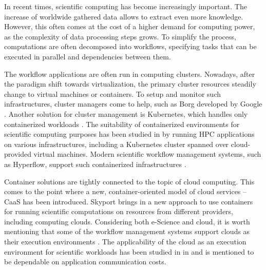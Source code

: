 

In recent times, scientific computing has become increasingly important.
The increase of worldwide gathered data allows to extract even more knowledge.
However, this often comes at the cost of a higher demand for computing power,
as the complexity of data processing steps grows.
To simplify the process, computations are often decomposed into workflows, specifying tasks that can be executed in parallel and dependencies between them.




The workflow applications are often run in computing clusters.
Nowadays, after the paradigm shift towards virtualization, the primary cluster resources steadily change to virtual machines or containers.
To setup and monitor such infrastructures, cluster managers come to help, such as Borg developed by Google \cite{b:Borg}.
Another solution for cluster management is Kubernetes, which handles only containerized workloads \cite{b:Kubernetes-what-is}.
The suitability of containerized environments for scientific computing purposes has been studied in \cite{b:Enable-HPC-Cloud-K8s} by running HPC applications on various infrastructures, including a Kubernetes cluster spanned over cloud-provided virtual machines.
Modern scientific workflow management systems, such as Hyperflow, support such containerized infrastructures \cite{b:Hyperflow-K8s}.


Container solutions are tightly connected to the topic of cloud computing.
This comes to the point where a new, container-oriented model of cloud services -- CaaS \cite{b:IBM-CaaS} has been introduced.
Skyport \cite{b:Skyport} brings in a new approach to use containers for running scientific computations on resources from different providers, including computing clouds.
Considering both e-Science and cloud, it is worth mentioning that some of the workflow management systems support clouds as their execution environments
\cite{b:Pegasus}.
The applicability of the cloud as an execution environment for scientific workloads has been studied in in \cite{b:Magellan} and is mentioned to be dependable on application communication costs.


